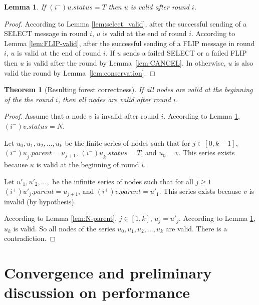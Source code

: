 \documentclass[twocolumn]{article}
\newtheorem{lemma}{Lemma}
\newtheorem{theorem}{Theorem}
\newcommand{\depends}[1]{}
\newcommand{\state}[3]{\ensuremath{(#2^{#3})#1}}
\newcommand{\uim}{\state{u}{i}{-}}
\newcommand{\vim}{\state{v}{i}{-}}
\newcommand{\uip}{\state{u}{i}{+}}
\newcommand{\vip}{\state{v}{i}{+}}
\begin{document}
\begin{lemma}
\label{lem:T-vald}
If $\uim.status=T$ then $u$ is valid after round $i$. 
\depends{  \ref{lem:CANCEL}, \ref{lem:FLIP-valid}, \ref{lem:conservation}, \ref{lem:select_valid}}
\end{lemma}
\begin{proof}
According to Lemma \ref{lem:select_valid}, after the successful sending of a SELECT message in round $i$, $u$ is valid at the end of round $i$. 
According to Lemma \ref{lem:FLIP-valid}, after the successful sending of a FLIP message in round $i$, $u$ is valid at the end of round $i$. 
If $u$ sends a failed SELECT or a failed FLIP then $u$ is valid after the round by Lemma~\ref{lem:CANCEL}.
In otherwise, $u$ is also valid the round by Lemma~\ref{lem:conservation}.

 \end{proof}


\begin{theorem}[Resulting forest correctness]
  \label{lem:nodes_validity}
  If all nodes are valid at the beginning of the the round $i$, then 
all nodes are valid after round $i$.
\depends{ \ref{lem:T-vald}, \ref{lem:N-parent} }
\end{theorem}
\begin{proof}

Assume that  a node $v$ is invalid after round $i$.
According to Lemma \ref{lem:T-vald}, $\vim.status = N$.

Let $u_0, u_1, u_2, ..., u_k$ be the finite series of nodes such 
that for $j \in [0,k-1]$,
$\uim_j.parent=u_{j+1}$, $\uim_k.status=T$, and $u_0=v$.
This series exists because $u$ is valid at the beginning of round $i$.

Let $u'_1, u'_2, ..., $ be the infinite series of nodes such 
that for all $j \geq 1$
$\uip'_j.parent=u_{j+1}$,  and 
$\vip.parent=u'_{1}$. 
This series exists because $v$ is invalid (by hypothesis).

According to Lemma \ref{lem:N-parent}, $j \in [1,k]$, $u_j=u'_j$.
According to Lemma \ref{lem:T-vald}, $u_k$ is valid.
So all nodes of the series $u_0, u_1, u_2, ..., u_k$ are valid.
There is a contradiction.
 \end{proof}


\section{Convergence and preliminary discussion on performance}
\label{sec:simulation}
\end{document}
